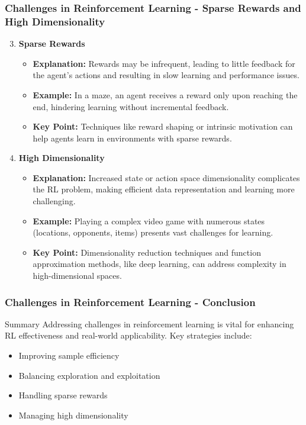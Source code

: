 \documentclass[aspectratio=169]{beamer}
\begin{document}
\begin{frame}[fragile]
    \frametitle{Challenges in Reinforcement Learning - Sparse Rewards and High Dimensionality}
    \begin{enumerate}
        \setcounter{enumi}{2} %
        \item \textbf{Sparse Rewards}
            \begin{itemize}
                \item \textbf{Explanation:} Rewards may be infrequent, leading to little feedback for the agent's actions and resulting in slow learning and performance issues.
                \item \textbf{Example:} In a maze, an agent receives a reward only upon reaching the end, hindering learning without incremental feedback.
                \item \textbf{Key Point:} Techniques like reward shaping or intrinsic motivation can help agents learn in environments with sparse rewards.
            \end{itemize}
        
        \item \textbf{High Dimensionality}
            \begin{itemize}
                \item \textbf{Explanation:} Increased state or action space dimensionality complicates the RL problem, making efficient data representation and learning more challenging.
                \item \textbf{Example:} Playing a complex video game with numerous states (locations, opponents, items) presents vast challenges for learning.
                \item \textbf{Key Point:} Dimensionality reduction techniques and function approximation methods, like deep learning, can address complexity in high-dimensional spaces.
            \end{itemize}
    \end{enumerate}
\end{frame}

\begin{frame}[fragile]
    \frametitle{Challenges in Reinforcement Learning - Conclusion}
    \begin{block}{Summary}
        Addressing challenges in reinforcement learning is vital for enhancing RL effectiveness and real-world applicability. Key strategies include:
    \end{block}
    \begin{itemize}
        \item Improving sample efficiency
        \item Balancing exploration and exploitation
        \item Handling sparse rewards
        \item Managing high dimensionality
    \end{itemize}
\end{frame}
\end{document}
